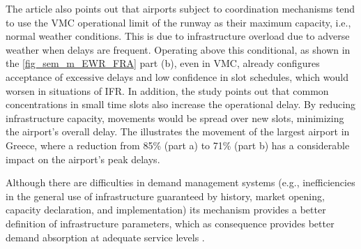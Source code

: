 %

The article \cite{cavusoglu2021minimum} also points out that airports subject to coordination mechanisms tend to use the \acrfull{VMC} operational limit of the runway as their maximum capacity, i.e., normal weather conditions. This is due to infrastructure overload due to adverse weather when delays are frequent. Operating above this conditional, as shown in the \ref{fig_sem_m_EWR_FRA} part (b), even in \acrshort{VMC}, already configures acceptance of excessive delays and low confidence in slot schedules, which would worsen in situations of \acrshort{IFR}. In addition, the study \cite{zografos2017increasing} points out that common concentrations in small time slots also increase the operational delay. By reducing infrastructure capacity, movements would be spread over new slots, minimizing the airport's overall delay. The  illustrates the movement of the largest airport in Greece, where a reduction from 85\% (part a) to 71\% (part b) has a considerable impact on the airport's peak delays.

%

Although there are difficulties in demand management systems (e.g., inefficiencies in the general use of infrastructure guaranteed by history, market opening, capacity declaration, and implementation) its mechanism provides a better definition of infrastructure parameters, which as consequence provides better demand absorption at adequate service levels \cite{morisset2011capacity}.